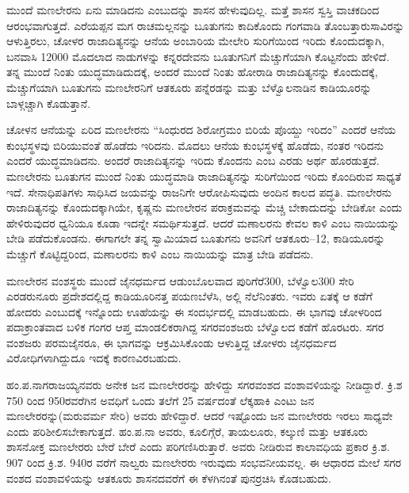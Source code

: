 ಮುಂದೆ ಮಣಲೇರನು ಏನು ಮಾಡಿದನು ಎಂಬುದನ್ನು ಶಾಸನ ಹೇಳುವುದಿಲ್ಲ. ಮತ್ತೆ ಶಾಸನ ಸ್ವಸ್ತಿ ವಾಚಕದಿಂದ ಆರಂಭವಾಗುತ್ತದೆ. ಎರೆಯಪ್ಪನ ಮಗ ರಾಚಮಲ್ಲನನ್ನು ಬೂತುಗನು ಕಾದಿಕೊಂದು ಗಂಗವಾಡಿ ತೊಂಬತ್ತಾರುಸಾವಿರನ್ನು ಆಳುತ್ತಿರಲು, ಚೋಳರ ರಾಜಾದಿತ್ಯನನ್ನು ಆನೆಯ ಅಂಬಾರಿಯ ಮೇಲೇರಿ ಸುರಿಗೆಯಿಂದ ಇರಿದು ಕೊಂದುದಕ್ಕಾಗಿ, ಬನವಾಸಿ 12000 ಮೊದಲಾದ ನಾಡುಗಳನ್ನು ಕನ್ನರದೇವನು ಬೂತುಗನಿಗೆ ಮೆಚ್ಚುಗೆಯಾಗಿ ಕೊಟ್ಟನೆಂದು ಹೇಳಿದೆ. ತನ್ನ ಮುಂದೆ ನಿಂತು ಯುದ್ಧಮಾಡಿದುದಕ್ಕೆ, ಅಂದರೆ ಮುಂದೆ ನಿಂತು ಹೋರಾಡಿ ರಾಜಾದಿತ್ಯನನ್ನು ಕೊಂದುದಕ್ಕೆ, ಮೆಚ್ಚುಗೆಯಾಗಿ ಬೂತುಗನು ಮಣಲೇರನಿಗೆ ಆತಕೂರು ಪನ್ನೆರಡನ್ನು ಮತ್ತು ಬೆಳ್ವೊಲನಾಡಿನ ಕಾಡಿಯೂರನ್ನು ಬಾಳ್ಗಚ್ಚಾಗಿ ಕೊಡುತ್ತಾನೆ. 

ಚೋಳನ ಆನೆಯನ್ನು ಏರಿದ ಮಣಲೇರನು “ಸಿಂಧುರದ ಶಿರೋಗ್ರಮಂ ಬಿರಿಯೆ ಪೊಯ್ದು ಇರಿದಂ” ಎಂದರೆ ಆನೆಯ ಕುಂಭಸ್ಥಳವು ಬಿರಿಯುವಂತೆ ಹೊಡೆದು ಇರಿದನು. ಮೊದಲು ಆನೆಯ ಕುಂಭಸ್ಥಳಕ್ಕೆ ಹೊಡೆದು, ನಂತರ ಇರಿದನು ಎಂದರೆ ಯುದ್ಧಮಾಡಿದನು. ಅಂದರೆ ರಾಜಾದಿತ್ಯನನ್ನು ಇರಿದು ಕೊಂದನು ಎಂಬ ಎರಡು ಅರ್ಥ ಹೊರಡುತ್ತದೆ. ಮಣಲೇರನು ಬೂತುಗನ ಮುಂದೆ ನಿಂತು ಯುದ್ಧಮಾಡಿ ರಾಜಾದಿತ್ಯನನ್ನು ಸುರಿಗೆಯಿಂದ ಇರಿದು ಕೊಂದಿರುವ ಸಾಧ್ಯತೆ ಇದೆ. ಸೇನಾಧಿಪತಿಗಳು ಸಾಧಿಸಿದ ಜಯವನ್ನು ರಾಜನಿಗೇ ಆರೋಪಿಸುವುದು ಅಂದಿನ ಕಾಲದ ಪದ್ಧತಿ. ಮಣಲೇರನು ರಾಜಾದಿತ್ಯನನ್ನು ಕೊಂದುದಕ್ಕಾಗಿಯೇ, ಕೃಷ್ಣನು ಮಣಲೇರನ ಪರಾಕ್ರಮವನ್ನು ಮೆಚ್ಚಿ ಬೇಕಾದುದನ್ನು ಬೇಡಿಕೋ ಎಂದು ಹೇಳಿರುವುದರ ಧ್ವನಿಯೂ ಕೂಡಾ ಇದನ್ನೇ ಸಮರ್ಥಿಸುತ್ತದೆ. ಆದರೆ ಮಣಾಲರನು ಕೇವಲ ಕಾಳಿ ಎಂಬ ನಾಯಿಯನ್ನು ಬೇಡಿ ಪಡೆದುಕೊಂಡನು. ಈಗಾಗಲೇ ತನ್ನ ಸ್ವಾಮಿಯಾದ ಬೂತುಗನು ಅವನಿಗೆ ಆತಕೂರು–12, ಕಾಡಿಯೂರನ್ನು ಮೆಚ್ಚುಗೆ ಕೊಟ್ಟಿದ್ದರಿಂದ, ಮಣಾಲರನು ಕಾಳಿ ಎಂಬ ನಾಯಿಯನ್ನು ಮಾತ್ರ ಬೇಡಿ ಪಡೆದನು.

ಮಣಲೇರನ ವಂಶಸ್ಥರು ಮುಂದೆ ಜೈನಧರ್ಮದ ಆಡುಂಬೊಲವಾದ ಪುರಿಗೆರೆ300, ಬೆಳ್ವೊಲ300 ಸೇರಿ ಎರಡರುನೂರು ಪ್ರದೇಶದಲ್ಲಿದ್ದ ಕಾಡಿಯೂರಿನತ್ತ ಪಯಣಬೆಳೆಸಿ, ಅಲ್ಲಿ ನೆಲೆನಿಂತರು. ಇವರು ಏತಕ್ಕೆ ಆ ಕಡೆಗೆ ಹೋದರು ಎಂಬುದಕ್ಕೆ ಇನ್ನೊಂದು ಊಹೆಯನ್ನು ಈ ಸಂದರ್ಭದಲ್ಲಿ ಮಾಡಬಹುದು. ಈ ಭಾಗವು ಚೋಳರಿಂದ ಪದಾಕ್ರಾಂತವಾದ ಬಳಿಕ ಗಂಗರ ಆಪ್ತ ಮಾಂಡಲಿಕರಾಗಿದ್ದ ಸಗರವಂಶಜರು ಬೆಳ್ವೊಲದ ಕಡೆಗೆ ಹೊರಟರು. ಸಗರ ವಂಶಜರು ಪರಮಜೈನರೂ, ಈ ಭಾಗವನ್ನು ಆಕ್ರಮಿಸಿಕೊಂಡು ಆಳುತ್ತಿದ್ದ ಚೋಳರು ಜೈನಧರ್ಮದ ವಿರೋಧಿಗಳಾಗಿದ್ದುದೂ ಇದಕ್ಕೆ ಕಾರಣವಿರಬಹುದು.

ಹಂ.ಪ.ನಾಗರಾಜಯ್ಯನವರು ಅನೇಕ ಜನ ಮಣಲೇರರನ್ನು ಹೇಳಿದ್ದು ಸಗರವಂಶದ ವಂಶಾವಳಿಯನ್ನು ನೀಡಿದ್ದಾರೆ. ಕ್ರಿ.ಶ 750 ರಿಂದ 950ರವರೆಗಿನ ಅವಧಿಗೆ ಒಂದು ತಲೆಗೆ 25 ವರ್ಷದಂತೆ ಲೆಕ್ಕಹಾಕಿ ಎಂಟು ಜನ ಮಣಲೇರರನ್ನು(ಮರುವರ್ಮ ಸೇರಿ) ಅವರು ಹೇಳಿದ್ದಾರೆ. ಆದರೆ ಇಷ್ಟೊಂದು ಜನ ಮಣಲೇರರು ಇರಲು ಸಾಧ್ಯವೇ ಎಂದು ಪರಿಶೀಲಿಸಬೇಕಾಗುತ್ತದೆ. ಹಂ.ಪ.ನಾ ಅವರು, ಕೂಲಿಗ್ಗೆರೆ, ತಾಯಲೂರು, ಕಲ್ಕುಣಿ ಮತ್ತು ಆತಕೂರು ಶಾಸನೋಕ್ತ ಮಣಲೇರರು ಬೇರೆ ಬೇರೆ ಎಂದು ಪರಿಗಣಿಸಿರುತ್ತಾರೆ. ಅವರು ನೀಡಿರುವ ಕಾಲಾವಧಿಯ ಪ್ರಕಾರ ಕ್ರಿ.ಶ. 907 ರಿಂದ ಕ್ರಿ.ಶ. 940ರ ವರೆಗೆ ನಾಲ್ವರು ಮಣಲೇರರು ಇರುವುದು ಸಂಭವನೀಯವಲ್ಲ. ಈ ಆಧಾರದ ಮೇಲೆ ಸಗರ ವಂಶದ ವಂಶಾವಳಿಯನ್ನು ಆತಕೂರು ಶಾಸನದವರೆಗೆ ಈ ಕೆಳಗಿನಂತೆ ಪುನರ್ರಚಿಸಿ ಕೊಡಬಹುದು.

